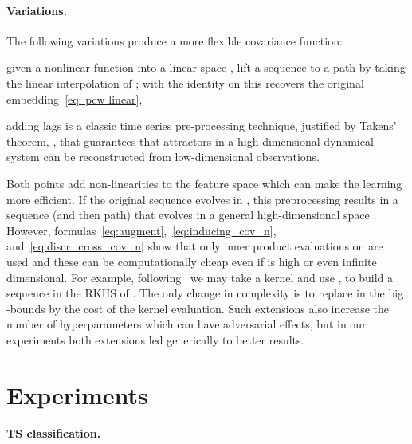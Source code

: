 \documentclass{article}
\begin{document}
\paragraph{Variations.}
The following variations produce a more flexible covariance function:
\begin{enumerate*}[label=(\roman*)]
  \item given a nonlinear function  into a linear space , lift a sequence  to a path by taking the linear interpolation of ; with  the identity on  this recovers the original embedding~\eqref{eq: pcw linear},    
  \item 
adding lags is a classic time series pre-processing technique, justified by Takens' theorem, \cite{takens1981detecting}, that guarantees that attractors in a high-dimensional dynamical system can be reconstructed from low-dimensional observations.
\end{enumerate*}
Both points add non-linearities to the feature space which can make the learning more efficient.
If the original sequence evolves in , this preprocessing results in a sequence (and then path) that evolves in a general high-dimensional space .
However, formulas~\eqref{eq:augment},~\eqref{eq:inducing_cov_n}, and~\eqref{eq:discr_cross_cov_n} show that only inner product evaluations on  are used and these can be computationally cheap even if  is high or even infinite dimensional. 
For example, following~\cite{KiralyOberhauser2019KSig} we may take a kernel  and use , to build a sequence  in the RKHS of .
The only change in complexity is to replace  in the big -bounds by the cost of the kernel evaluation. 
Such extensions also increase the number of hyperparameters which can have adversarial effects, but in our experiments both extensions led generically to better results. 

\section{Experiments} \label{sec:experiments}


\paragraph{TS classification.}
\end{document}
